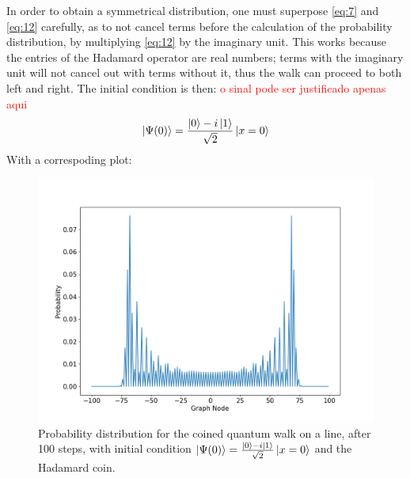                 In order to obtain a symmetrical distribution, one must superpose \ref{eq:7} and \ref{eq:12} carefully, as to not cancel terms before the calculation of the probability distribution, by multiplying \ref{eq:12} by the imaginary unit. This works because the entries of the Hadamard operator are real numbers; terms with the imaginary unit will not cancel out with terms without it, thus the walk can proceed to both left and right. The initial condition is then: \textcolor{red}{o sinal pode ser justificado apenas aqui}
                \begin{equation}
                    \ket{\Psi(0)} = \frac{\ket{0}-i\ket{1}}{\sqrt{2}}\ket{x=0}
                    \label{eq:12}
                \end{equation}
                With a correspoding plot:
    	        \begin{figure}[!ht]
                    \centering
                    \includegraphics[scale=0.40]{img/CoinedQW/Coinedpsi001.png}
                    \caption{Probability distribution for the coined quantum walk on a line, after 100 steps, with initial condition $\ket{\Psi(0)}=\frac{\ket{0}-i\ket{1}}{\sqrt{2}}\ket{x=0}$ and the Hadamard coin.} 
                    \label{fig:coinedwalk3}
                \end{figure}
                
                

